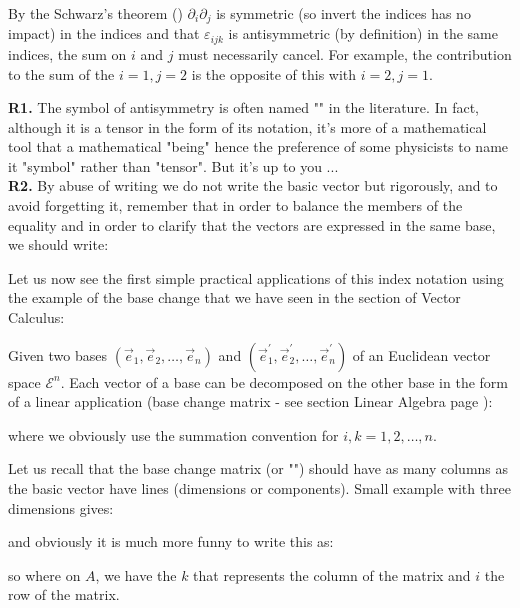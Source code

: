 	By the Schwarz's theorem () $\partial_i\partial_j$ is symmetric (so invert the indices has no impact) in the indices and that $\varepsilon_{ijk}$ is antisymmetric (by definition) in the same indices, the sum on $i$ and $j$ must necessarily cancel. For example, the contribution to the sum of the $i=1,j=2$ is the opposite of this with $i=2,j=1$.
	
	\begin{tcolorbox}[title=Remarks,colframe=black,arc=10pt]
	\textbf{R1.} The symbol of antisymmetry is often named "" in the literature. In fact, although it is a tensor in the form of its notation, it's more of a mathematical tool that a mathematical "being" hence the preference of some physicists to name it "symbol" rather than "tensor". But it's up to you ...\\
	
	\textbf{R2.} By abuse of writing we do not write the basic vector but rigorously, and to avoid forgetting it, remember that in order to balance the members of the equality and in order to clarify that the vectors are expressed in the same base, we should write:
	
	\end{tcolorbox}
	Let us now see the first simple practical applications of this index notation using the example of the base change that we have seen in the section of Vector Calculus:
	
	Given two bases $(\vec{e}_1,\vec{e}_2,\ldots,\vec{e}_n)$ and $(\vec{e}_1^{'},\vec{e}_2^{'},\ldots,\vec{e}_n^{'})$ of an Euclidean vector space $\mathcal{E}^n$. Each vector of a base can be decomposed on the other base in the form of a linear application (base change matrix - see section Linear Algebra page \pageref{change of basis}):
	
	where we obviously use the summation convention for $i,k=1,2,\ldots,n$.
	
	Let us recall that the base change matrix (or "") should have as many columns as the basic vector have lines (dimensions or components). Small example with three dimensions gives:
	
	and obviously it is much more funny to write this as:
	
	so where on $A$, we have the $k$ that represents the column of the matrix and $i$ the row of the matrix.

